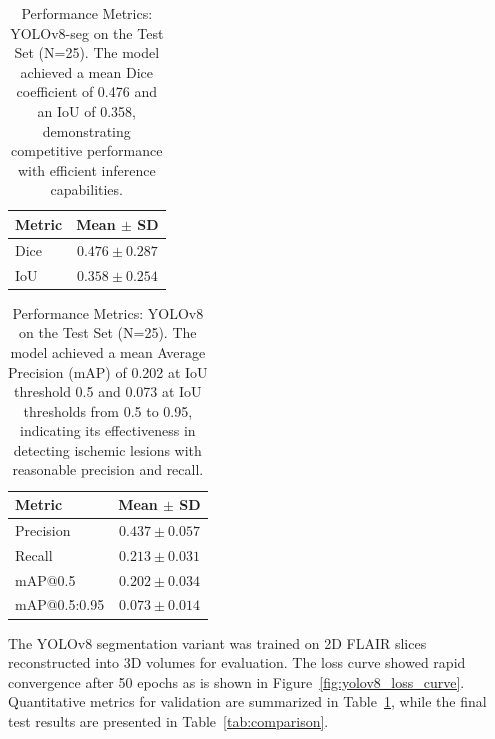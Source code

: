 \documentclass[12pt]{article}
\begin{document}
\begin{table}[tp]
  \centering
    \begin{tabular}{lc}
      \toprule
        Metric & Mean $\pm$ SD \\
      \midrule
        Dice & $0.476 \pm 0.287$ \\
        IoU & $0.358 \pm 0.254$ \\
      \bottomrule
    \end{tabular}
  \caption{Performance Metrics: YOLOv8-seg on the Test Set (N=25). The model achieved a mean Dice coefficient of 0.476 and an IoU of 0.358, demonstrating competitive performance with efficient inference capabilities.}\label{tab:yolov8_metrics}
\end{table}

\begin{table}[tp]
\centering
\begin{tabular}{lc}
\toprule
Metric & Mean $\pm$ SD \\
\midrule
Precision & $0.437 \pm 0.057$ \\
Recall & $0.213 \pm 0.031$ \\
mAP@0.5 & $0.202 \pm 0.034$ \\
mAP@0.5:0.95 & $0.073 \pm 0.014$ \\
\bottomrule
\end{tabular}
\caption{Performance Metrics: YOLOv8 on the Test Set (N=25). The model achieved a mean Average Precision (mAP) of 0.202 at IoU threshold 0.5 and 0.073 at IoU thresholds from 0.5 to 0.95, indicating its effectiveness in detecting ischemic lesions with reasonable precision and recall.}
\label{tab:yolov8_detection_metrics}
\end{table}

The YOLOv8 segmentation variant was trained on 2D FLAIR slices reconstructed into 3D volumes for evaluation. The loss curve showed rapid convergence after 50 epochs as is shown in Figure~\ref{fig:yolov8_loss_curve}. Quantitative metrics for validation are summarized in Table~\ref{tab:yolov8_metrics}, while the final test results are presented in Table~\ref{tab:comparison}.
\end{document}
